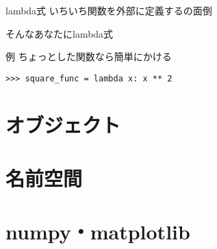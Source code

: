 \documentclass[12pt, xetex, xcolor=pdftex, dvipsnames]{beamer}
\begin{document}
\begin{frame}{lambda式}
    いちいち関数を外部に定義するの面倒

    そんなあなたにlambda式
\end{frame}
\begin{frame}[fragile]{例}
ちょっとした関数なら簡単にかける

\begin{lstlisting}
>>> square_func = lambda x: x ** 2
\end{lstlisting}

\end{frame}
\section{オブジェクト}

\section{名前空間}

\section{numpy・matplotlib}
\end{document}
